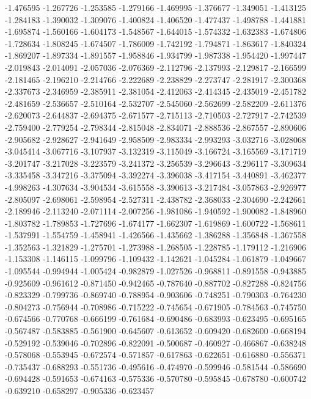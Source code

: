 -1.476595
-1.267726
-1.253585
-1.279166
-1.469995
-1.376677
-1.349051
-1.413125
-1.284183
-1.390032
-1.309076
-1.400824
-1.406520
-1.477437
-1.498788
-1.441881
-1.695874
-1.560166
-1.604173
-1.548567
-1.644015
-1.574332
-1.632383
-1.674806
-1.728634
-1.808245
-1.674507
-1.786009
-1.742192
-1.794871
-1.863617
-1.840324
-1.869207
-1.897334
-1.891557
-1.958846
-1.934799
-1.987338
-1.954420
-1.997447
-2.019843
-2.014091
-2.057036
-2.076369
-2.112796
-2.137993
-2.129817
-2.166599
-2.181465
-2.196210
-2.214766
-2.222689
-2.238829
-2.273747
-2.281917
-2.300368
-2.337673
-2.346959
-2.385911
-2.381054
-2.412063
-2.414345
-2.435019
-2.451782
-2.481659
-2.536657
-2.510164
-2.532707
-2.545060
-2.562699
-2.582209
-2.611376
-2.620073
-2.644837
-2.694375
-2.671577
-2.715113
-2.710503
-2.727917
-2.742539
-2.759400
-2.779254
-2.798344
-2.815048
-2.834071
-2.888536
-2.867557
-2.890606
-2.905682
-2.928627
-2.941649
-2.958509
-2.983334
-2.993293
-3.032716
-3.028068
-3.045414
-3.067716
-3.107937
-3.132319
-3.115049
-3.166724
-3.165569
-3.171719
-3.201747
-3.217028
-3.223579
-3.241372
-3.256539
-3.296643
-3.296117
-3.309634
-3.335458
-3.347216
-3.375094
-3.392274
-3.396038
-3.417154
-3.440891
-3.462377
-4.998263
-4.307634
-3.904534
-3.615558
-3.390613
-3.217484
-3.057863
-2.926977
-2.805097
-2.698061
-2.598954
-2.527311
-2.438782
-2.368033
-2.304690
-2.242661
-2.189946
-2.113240
-2.071114
-2.007256
-1.981086
-1.940592
-1.900082
-1.848960
-1.803782
-1.789853
-1.727696
-1.674177
-1.662307
-1.619869
-1.600722
-1.568611
-1.537991
-1.554759
-1.458941
-1.426566
-1.435662
-1.386288
-1.356848
-1.367558
-1.352563
-1.321829
-1.275701
-1.273988
-1.268505
-1.228785
-1.179112
-1.216906
-1.153308
-1.146115
-1.099796
-1.109432
-1.142621
-1.045284
-1.061879
-1.049667
-1.095544
-0.994944
-1.005424
-0.982879
-1.027526
-0.968811
-0.891558
-0.943885
-0.925609
-0.961612
-0.871450
-0.942465
-0.787640
-0.887702
-0.827288
-0.824756
-0.823329
-0.799736
-0.869740
-0.788954
-0.903606
-0.748251
-0.790303
-0.764230
-0.804273
-0.756944
-0.708986
-0.715222
-0.745654
-0.671905
-0.784563
-0.745750
-0.674566
-0.770768
-0.666199
-0.761684
-0.690486
-0.683993
-0.623495
-0.695165
-0.567487
-0.583885
-0.561900
-0.645607
-0.613652
-0.609420
-0.682600
-0.668194
-0.529192
-0.539046
-0.702896
-0.822091
-0.500687
-0.460927
-0.466867
-0.638248
-0.578068
-0.553945
-0.672574
-0.571857
-0.617863
-0.622651
-0.616880
-0.556371
-0.735437
-0.688293
-0.551736
-0.495616
-0.474970
-0.599946
-0.581544
-0.586690
-0.694428
-0.591653
-0.674163
-0.575336
-0.570780
-0.595845
-0.678780
-0.600742
-0.639210
-0.658297
-0.905336
-0.623457
